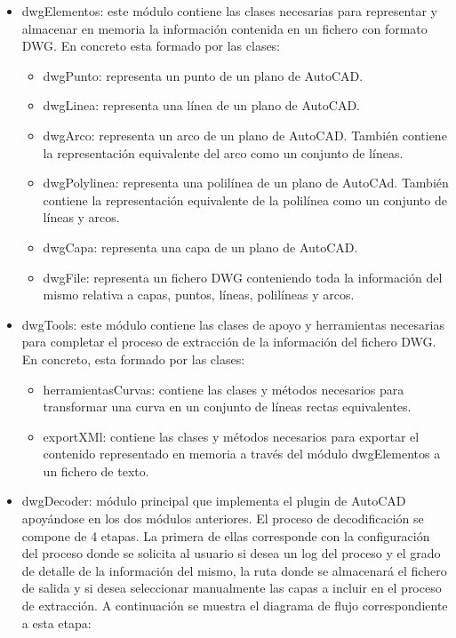 \begin{itemize}

\item{dwgElementos: este módulo contiene las clases necesarias para representar y almacenar en memoria la información contenida en un fichero con formato DWG. En concreto esta formado por las clases:}

\begin{itemize}

\item{dwgPunto: representa un punto de un plano de AutoCAD.}
\item{dwgLinea: representa una línea de un plano de AutoCAD.}
\item{dwgArco: representa un arco de un plano de AutoCAD. También contiene la representación equivalente del arco como un conjunto de líneas.}
\item{dwgPolylinea: representa una polilínea de un plano de AutoCAd. También contiene la representación equivalente de la polilínea como un conjunto de líneas y arcos.}
\item{dwgCapa: representa una capa de un plano de AutoCAD.}
\item{dwgFile: representa un fichero DWG conteniendo toda la información del mismo relativa a capas, puntos, líneas, polilíneas y arcos.}

\end{itemize}

\item{dwgTools: este módulo contiene las clases de apoyo y herramientas necesarias para completar el proceso de extracción de la información del fichero DWG. En concreto, esta formado por las clases:}

\begin{itemize}

\item{herramientasCurvas: contiene las clases y métodos necesarios para transformar una curva en un conjunto de líneas rectas equivalentes.}
\item{exportXMl: contiene las clases y métodos necesarios para exportar el contenido representado en memoria a través del módulo dwgElementos a un fichero de texto.}

\end{itemize}

\item{dwgDecoder: módulo principal que implementa el plugin de AutoCAD apoyándose en los dos módulos anteriores.
El proceso de decodificación se compone de 4 etapas. La primera de ellas corresponde con la configuración del proceso donde se solicita al usuario si desea un log del proceso y el grado de detalle de la información del mismo, la ruta donde se almacenará el fichero de salida y si desea seleccionar manualmente las capas a incluir en el proceso de extracción. A continuación se muestra el diagrama de flujo correspondiente a esta etapa:

}
\end{itemize}
